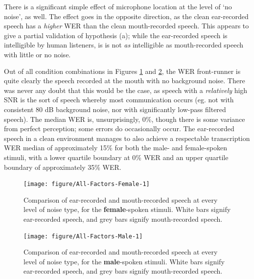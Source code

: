 There is a significant simple effect of microphone location at the level of `no noise', as well.  The effect goes in the opposite direction, as the clean ear-recorded speech has a \textit{higher} WER than the clean mouth-recorded speech.  This appears to give a partial validation of hypothesis (a); while the ear-recorded speech is intelligible by human listeners, is is not \textit{as} intelligible as mouth-recorded speech with little or no noise.

Out of all condition combinations in Figures \ref{fig:female-split} and \ref{fig:male-split}, the WER front-runner is quite clearly the speech recorded at the mouth with no background noise.  There was never any doubt that this would be the case, as speech with a \textit{relatively} high SNR is the sort of speech whereby most communication occurs (eg. not with consistent 80 dB background noise, nor with significantly low-pass filtered speech).  The median WER is, unsurprisingly, 0\%, though there is some variance from perfect perception; some errors do occasionally occur. The ear-recorded speech in a clean environment manages to also achieve a respectable transcription WER median of approximately 15\% for both the male- and female-spoken stimuli, with a lower quartile boundary at 0\% WER and an upper quartile boundary of approximately 35\% WER.


\begin{figure}[h!]
\centering

\texttt{[image: figure/All-Factors-Female-1]} 

\caption{Comparison of ear-recorded and mouth-recorded speech at every level of noise type, for the \textbf{female}-spoken stimuli.  White bars signify ear-recorded speech, and grey bars signify mouth-recorded speech.}\label{fig:female-split}
\end{figure}

\begin{figure}[h!]
\centering

\texttt{[image: figure/All-Factors-Male-1]} 

\caption{Comparison of ear-recorded and mouth-recorded speech at every level of noise type, for the \textbf{male}-spoken stimuli.  White bars signify ear-recorded speech, and grey bars signify mouth-recorded speech.}\label{fig:male-split}
\end{figure}


